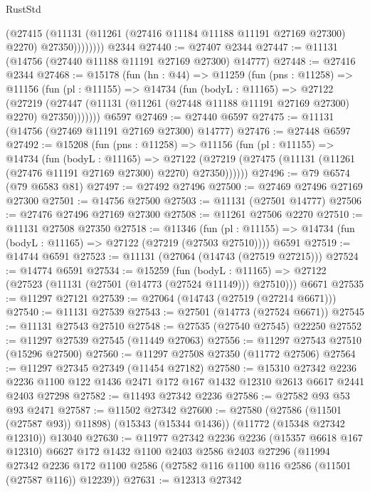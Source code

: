 \begin{lexlean}{RustStd}
\begin{coremodule}
                (@27415
                  (@11131 (@11261 (@27416 @11184 @11188 @11191 @27169 @27300) @2270) @27350))))))))
    @2344
@27440 := @27407 @2344
@27447 := @11131 (@14756 (@27440 @11188 @11191 @27169 @27300) @14777)
@27448 := @27416 @2344
@27468 := @15178
    (fun (hn : @44) =>
    @11259
      (fun (pns : @11258) =>
      @11156
        (fun (pl : @11155) =>
        @14734
          (fun (bodyL : @11165) =>
          @27122
            (@27219
              (@27447 (@11131 (@11261 (@27448 @11188 @11191 @27169 @27300) @2270) @27350)))))))
    @6597
@27469 := @27440 @6597
@27475 := @11131 (@14756 (@27469 @11191 @27169 @27300) @14777)
@27476 := @27448 @6597
@27492 := @15208
    (fun (pns : @11258) =>
    @11156
      (fun (pl : @11155) =>
      @14734
        (fun (bodyL : @11165) =>
        @27122 (@27219 (@27475 (@11131 (@11261 (@27476 @11191 @27169 @27300) @2270) @27350))))))
@27496 := @79 @6574 (@79 @6583 @81)
@27497 := @27492 @27496
@27500 := @27469 @27496 @27169 @27300
@27501 := @14756 @27500
@27503 := @11131 (@27501 @14777)
@27506 := @27476 @27496 @27169 @27300
@27508 := @11261 @27506 @2270
@27510 := @11131 @27508 @27350
@27518 := @11346
    (fun (pl : @11155) => @14734 (fun (bodyL : @11165) => @27122 (@27219 (@27503 @27510))))
    @6591
@27519 := @14744 @6591
@27523 := @11131 (@27064 (@14743 (@27519 @27215)))
@27524 := @14774 @6591
@27534 := @15259
    (fun (bodyL : @11165) => @27122 (@27523 (@11131 (@27501 (@14773 (@27524 @11149))) @27510)))
    @6671
@27535 := @11297 @27121
@27539 := @27064 (@14743 (@27519 (@27214 @6671)))
@27540 := @11131 @27539
@27543 := @27501 (@14773 (@27524 @6671))
@27545 := @11131 @27543 @27510
@27548 := @27535 (@27540 @27545) @22250
@27552 := @11297 @27539 @27545 (@11449 @27063)
@27556 := @11297 @27543 @27510 (@15296 @27500)
@27560 := @11297 @27508 @27350 (@11772 @27506)
@27564 := @11297 @27345 @27349 (@11454 @27182)
@27580 := @15310
    @27342
    @2236
    @2236
    @1100
    @122
    @1436
    @2471
    @172
    @167
    @1432
    @12310
    @2613
    @6617
    @2441
    @2403
    @27298
@27582 := @11493 @27342 @2236
@27586 := @27582 @93 @53 @93 @2471
@27587 := @11502 @27342
@27600 := @27580
    (@27586 (@11501 (@27587 @93)) @11898)
    (@15343 (@15344 @1436))
    (@11772 (@15348 @27342 @12310))
    @13040
@27630 := @11977
    @27342
    @2236
    @2236
    (@15357 @6618 @167 @12310)
    @6627
    @172
    @1432
    @1100
    @2403
    @2586
    @2403
    @27296
    (@11994
      @27342
      @2236
      @172
      @1100
      @2586
      (@27582 @116 @1100 @116 @2586 (@11501 (@27587 @116)) @12239))
@27631 := @12313 @27342

\end{coremodule}
\end{lexlean}
